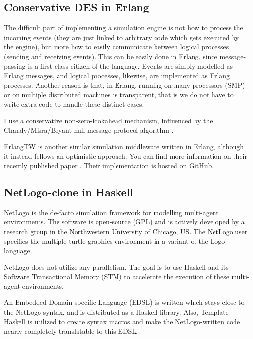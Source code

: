 \documentclass[a4paper]{article}
\begin{document}
\subsection{Conservative DES in Erlang}

The difficult part of implementing a simulation engine is not how to process the incoming events (they are just linked to arbitrary code which gets executed by the engine), but more how to easily communicate between logical processes (sending and receiving events). This can be easily done in Erlang, since message-passing is a first-class citizen of the language. Events are simply modelled as Erlang messages, and logical processes, likewise, are implemented as Erlang processes. Another reason is that, in Erlang, running on many processors (SMP) or on multiple distributed machines is transparent, that is we do not have to write extra code to handle these distinct cases.

I use a conservative non-zero-lookahead mechanism, influenced by the Chandy/Misra/Bryant null message protocol algorithm \cite{misra_distributed_1986}.

ErlangTW is another similar simulation middleware written in Erlang, although it instead follows an optimistic approach. You can find more information on their recently published paper \cite{toscano_parallel_2012}. Their implementation is hosted on \href{https://github.com/lucatoscano/ErlangTW}{GitHub}.

\subsection{NetLogo-clone in Haskell}

\href{http://ccl.northwestern.edu/netlogo/}{NetLogo} is the de-facto simulation framework for modelling multi-agent environments. The software is open-source (GPL) and is actively developed by a research group in the Northwestern University of Chicago, US. 
The NetLogo user specifies the multiple-turtle-graphics environment in a variant of the Logo language.

NetLogo does not utilize any parallelism. The goal is to use Haskell and its Software Transactional Memory (STM) to accelerate the execution of these multi-agent environments.
 
An Embedded Domain-specific Language (EDSL) is written which stays close to the NetLogo syntax, and is distributed as a Haskell library. Also, Template Haskell is utilized to create syntax macros
and make the NetLogo-written code nearly-completely translatable to this EDSL.
\end{document}
